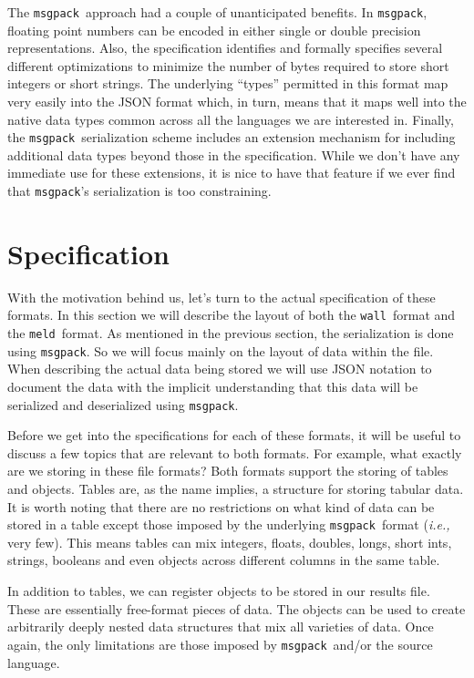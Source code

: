 \documentclass[11pt,a4paper,twocolumn]{article}
\newcommand{\wall}{\texttt{wall}}
\newcommand{\meld}{\texttt{meld}}
\newcommand{\msgpack}{\texttt{msgpack}}
\begin{document}
The \msgpack\ approach had a couple of unanticipated benefits.  In
\msgpack, floating point numbers can be encoded in either single or
double precision representations.  Also, the specification identifies
and formally specifies several different optimizations to minimize the
number of bytes required to store short integers or short strings.
The underlying ``types'' permitted in this format map very easily into
the JSON format which, in turn, means that it maps well into the
native data types common across all the languages we are interested
in.  Finally, the \msgpack\ serialization scheme includes an extension
mechanism for including additional data types beyond those in the
specification.  While we don't have any immediate use for these
extensions, it is nice to have that feature if we ever find that
\msgpack's serialization is too constraining.

\section{Specification}
\label{sec:spec}

With the motivation behind us, let's turn to the actual specification
of these formats.  In this section we will describe the layout of both
the \wall\ format and the \meld\ format.  As mentioned in the previous
section, the serialization is done using \msgpack.  So we will focus
mainly on the layout of data within the file.  When describing the
actual data being stored we will use JSON notation to document the
data with the implicit understanding that this data will be serialized
and deserialized using \msgpack.


Before we get into the specifications for each of these formats, it
will be useful to discuss a few topics that are relevant to both
formats.  For example, what exactly are we storing in these file
formats?  Both formats support the storing of tables and objects.
Tables are, as the name implies, a structure for storing tabular data.
It is worth noting that there are no restrictions on what kind of data
can be stored in a table except those imposed by the underlying
\msgpack\ format (\textit{i.e.,} very few).  This means tables can mix
integers, floats, doubles, longs, short ints, strings, booleans and
even objects across different columns in the same table.

In addition to tables, we can register objects to be stored in our
results file.  These are essentially free-format pieces of data.  The
objects can be used to create arbitrarily deeply nested data
structures that mix all varieties of data.  Once again, the only
limitations are those imposed by \msgpack\ and/or the source language.
\end{document}
